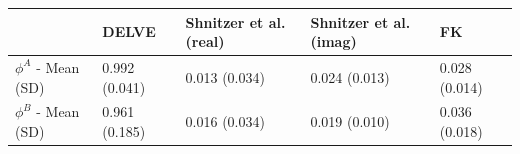 \begin{tabular}{lllll}
\toprule
 & DELVE & Shnitzer et al. (real) & Shnitzer et al. (imag) & FK \\
\midrule
$\phi^A$ - Mean (SD) & 0.992 (0.041) & 0.013 (0.034) & 0.024 (0.013) & 0.028 (0.014) \\
$\phi^B$ - Mean (SD) & 0.961 (0.185) & 0.016 (0.034) & 0.019 (0.010) & 0.036 (0.018) \\
\bottomrule
\end{tabular}
